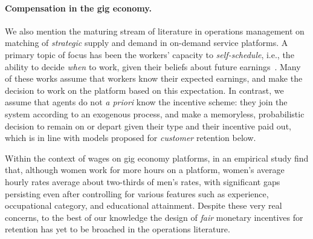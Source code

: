 \documentclass[12pt]{article}
\begin{document}
\paragraph{Compensation in the gig economy.} We also mention the maturing stream of literature in operations management on matching of {{\it strategic}} supply and demand in on-demand service platforms. {A primary topic of focus has been {the} workers' capacity to {\it self-schedule}, i.e., the ability to decide {\it when} to work, given their beliefs about future earnings~\cite{dong2020managing,cachon2017role,gurvich2019operations,banerjee2015pricing,castillo2017surge,taylor2018demand,yang2018mean,bimpikis2019spatial,lobel2021employees,lian2021larger}.} Many of these works assume that workers know their expected earnings, and make the decision to work on the platform based on this expectation. In contrast, we assume that agents do not \emph{a priori} know the incentive scheme: they join the system according to an exogenous process, and make a {memoryless}, probabilistic decision to remain on or depart given their type and their incentive paid out, which is in line with models proposed for {\it customer} retention below. 

Within the context of wages on gig economy platforms, in an empirical study \cite{barzilay2016platform} find that, although women work for more hours on a platform, women's average hourly rates average about two-thirds of men's rates, with significant gaps persisting even after controlling for various features such as experience, occupational category, and educational attainment. Despite these very real concerns, to the best of our knowledge the design of {\it fair} monetary incentives for retention has yet to be broached in the operations literature.
\end{document}
